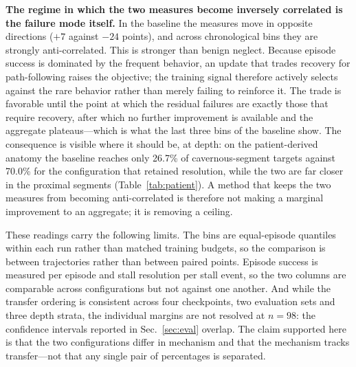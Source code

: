 \textbf{The regime in which the two measures become inversely correlated is the failure mode
itself.} In the baseline the measures move in opposite directions ($+7$ against $-24$ points),
and across chronological bins they are strongly anti-correlated. This is stronger than benign
neglect. Because episode success is dominated by the frequent behavior, an update that trades
recovery for path-following raises the objective; the training signal therefore actively selects
against the rare behavior rather than merely failing to reinforce it. The trade is favorable
until the point at which the residual failures are exactly those that require recovery, after
which no further improvement is available and the aggregate plateaus---which is what the last
three bins of the baseline show. The consequence is visible where it should be, at depth: on the
patient-derived anatomy the baseline reaches only 26.7\% of cavernous-segment targets against
70.0\% for the configuration that retained resolution, while the two are far closer in the
proximal segments (Table~\ref{tab:patient}). A method that keeps the two measures from becoming
anti-correlated is therefore not making a marginal improvement to an aggregate; it is removing a
ceiling.

These readings carry the following limits. The bins are equal-episode quantiles within each run
rather than matched training budgets, so the comparison is between trajectories rather than
between paired points. Episode success is measured per episode and stall resolution per stall
event, so the two columns are comparable across configurations but not against one another.
And while the transfer ordering is consistent across four checkpoints, two evaluation sets and
three depth strata, the individual margins are not resolved at $n = 98$: the confidence intervals
reported in Sec.~\ref{sec:eval} overlap. The claim supported here is that the two configurations
differ in mechanism and that the mechanism tracks transfer---not that any single pair of
percentages is separated.

%
%
